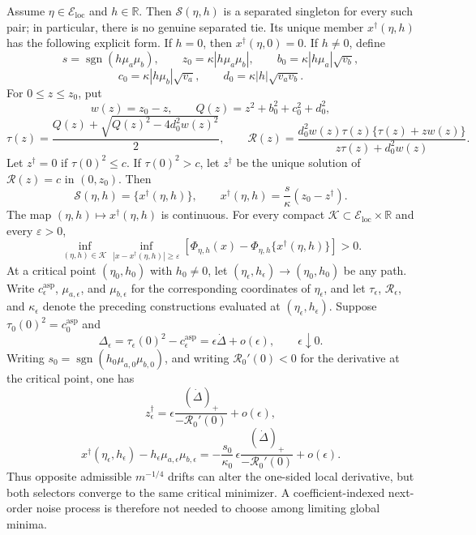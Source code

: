 Assume \(\eta\in\mathcal E_{\mathrm{loc}}\) and \(h\in\mathbb R\).  Then \(\mathcal S(\eta,h)\) is a separated singleton for every such pair; in particular, there is no genuine separated tie.  Its unique member \(x^\dagger(\eta,h)\) has the following explicit form.  If \(h=0\), then \(x^\dagger(\eta,0)=0\).  If \(h\neq0\), define
\[
s=\operatorname{sgn}(h\mu_a\mu_b),\qquad
z_0=\kappa|h\mu_a\mu_b|,\qquad
b_0=\kappa|h\mu_a|\sqrt{v_b},
\]
\[
c_0=\kappa|h\mu_b|\sqrt{v_a},\qquad
d_0=\kappa|h|\sqrt{v_av_b}.
\]
For \(0\leq z\leq z_0\), put
\[
w(z)=z_0-z,\qquad
Q(z)=z^2+b_0^2+c_0^2+d_0^2,
\]
\[
\tau(z)=\frac{Q(z)+\sqrt{Q(z)^2-4d_0^2w(z)^2}}{2},
\qquad
\mathcal R(z)=
\frac{d_0^2w(z)\tau(z)\{\tau(z)+zw(z)\}}
{z\tau(z)+d_0^2w(z)}.
\]
Let \(z^\dagger=0\) if \(\tau(0)^2\leq c\).  If \(\tau(0)^2>c\), let \(z^\dagger\) be the unique solution of \(\mathcal R(z)=c\) in \((0,z_0)\).  Then
\[
\mathcal S(\eta,h)=\{x^\dagger(\eta,h)\},
\qquad
x^\dagger(\eta,h)=\frac{s}{\kappa}(z_0-z^\dagger).
\]
The map \((\eta,h)\mapsto x^\dagger(\eta,h)\) is continuous.  For every compact \(\mathcal K\subset\mathcal E_{\mathrm{loc}}\times\mathbb R\) and every \(\varepsilon>0\),
\[
\inf_{(\eta,h)\in\mathcal K}
\inf_{|x-x^\dagger(\eta,h)|\geq\varepsilon}
\left[\Phi_{\eta,h}(x)-
\Phi_{\eta,h}\{x^\dagger(\eta,h)\}\right]>0.
\]
At a critical point \((\eta_0,h_0)\) with \(h_0\neq0\), let \((\eta_\epsilon,h_\epsilon)\to(\eta_0,h_0)\) be any path.  Write \(c_\epsilon^{\mathrm{asp}}\), \(\mu_{a,\epsilon}\), and \(\mu_{b,\epsilon}\) for the corresponding coordinates of \(\eta_\epsilon\), and let \(\tau_\epsilon\), \(\mathcal R_\epsilon\), and \(\kappa_\epsilon\) denote the preceding constructions evaluated at \((\eta_\epsilon,h_\epsilon)\).  Suppose \(\tau_0(0)^2=c_0^{\mathrm{asp}}\) and
\[
\Delta_\epsilon=\tau_\epsilon(0)^2-c_\epsilon^{\mathrm{asp}}
=\epsilon\dot\Delta+o(\epsilon),
\qquad \epsilon\downarrow0.
\]
Writing \(s_0=\operatorname{sgn}(h_0\mu_{a,0}\mu_{b,0})\), and writing \(\mathcal R_0'(0)<0\) for the derivative at the critical point, one has
\[
z^\dagger_\epsilon=
\epsilon\frac{(\dot\Delta)_+}{-\mathcal R_0'(0)}+o(\epsilon),
\]
\[
x^\dagger(\eta_\epsilon,h_\epsilon)
-h_\epsilon\mu_{a,\epsilon}\mu_{b,\epsilon}
=-\frac{s_0}{\kappa_0}\,
\epsilon\frac{(\dot\Delta)_+}{-\mathcal R_0'(0)}+o(\epsilon).
\]
Thus opposite admissible \(m^{-1/4}\) drifts can alter the one-sided local derivative, but both selectors converge to the same critical minimizer.  A coefficient-indexed next-order noise process is therefore not needed to choose among limiting global minima.
